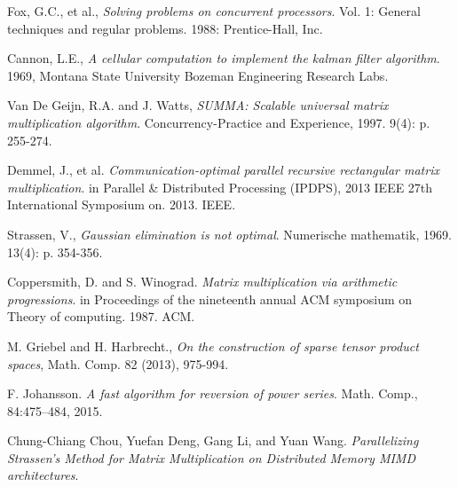 \documentclass{amsart}
\theoremstyle{definition}
\theoremstyle{remark}
\numberwithin{equation}{section}
\begin{document}

\begin{thebibliography}{10}

Fox, G.C., et al., \textit{Solving problems on concurrent processors}. 
Vol. 1: General techniques and regular problems. 1988: Prentice-Hall, Inc.

Cannon, L.E., \textit{A cellular computation to implement the kalman filter algorithm}.
 1969, Montana State University Bozeman Engineering Research Labs.

Van De Geijn, R.A. and J. Watts, \textit{SUMMA: Scalable universal matrix multiplication algorithm}.
 Concurrency-Practice and Experience, 1997. 9(4): p. 255-274.

Demmel, J., et al. \textit{Communication-optimal parallel recursive rectangular matrix multiplication}.
 in Parallel \& Distributed Processing (IPDPS), 2013 IEEE 27th International Symposium on. 2013. IEEE.

Strassen, V., \textit{Gaussian elimination is not optimal}. Numerische mathematik, 1969. 13(4): p. 354-356.

Coppersmith, D. and S. Winograd. \textit{Matrix multiplication via arithmetic progressions}.
 in Proceedings of the nineteenth annual ACM symposium on Theory of computing. 1987. ACM.

M. Griebel and H. Harbrecht., \textit{On the construction of sparse tensor product spaces},
 Math. Comp. 82 (2013), 975-994.

 F. Johansson. \textit{A fast algorithm for reversion of power series}. Math. Comp., 84:475–484, 2015.

Chung-Chiang Chou, Yuefan Deng, Gang Li, and Yuan Wang. 
\textit{Parallelizing Strassen's Method for Matrix Multiplication on Distributed Memory MIMD architectures}.

\end{thebibliography}
\newpage
\end{document}
